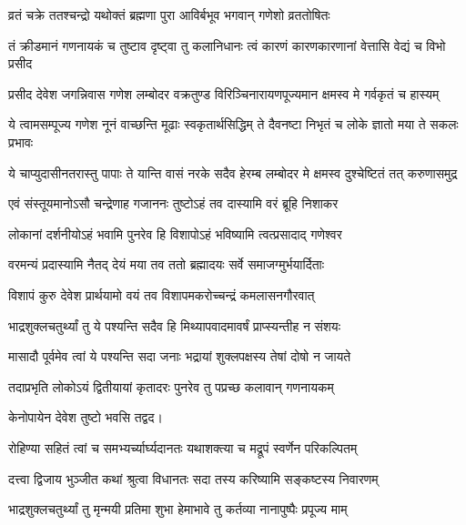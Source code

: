 \begin{center}
\twolineshloka
{व्रतं चक्रे ततश्चन्द्रो यथोक्तं ब्रह्मणा पुरा}
{आविर्बभूव भगवान् गणेशो व्रततोषितः}%

\fourlineindentedshloka
{तं क्रीडमानं गणनायकं च}
{तुष्टाव दृष्ट्वा तु कलानिधानः}
{त्वं कारणं कारणकारणानां}
{वेत्तासि वेद्यं च विभो प्रसीद}%

\fourlineindentedshloka
{प्रसीद देवेश जगन्निवास}
{गणेश लम्बोदर वक्रतुण्ड}
{विरिञ्चिनारायणपूज्यमान}
{क्षमस्व मे गर्वकृतं च हास्यम्}%

\fourlineindentedshloka
{ये त्वामसम्पूज्य गणेश नूनं}
{वाच्छन्ति मूढाः स्वकृतार्थसिद्धिम्}
{ते दैवनष्टा निभृतं च लोके}
{ज्ञातो मया ते सकलः प्रभावः}%

\fourlineindentedshloka
{ये चाप्युदासीनतरास्तु पापाः}
{ते यान्ति वासं नरके सदैव}
{हेरम्ब लम्बोदर मे क्षमस्व}
{दुश्चेष्टितं तत् करुणासमुद्र}%

\twolineshloka
{एवं संस्तूयमानोऽसौ चन्द्रेणाह गजाननः}
{तुष्टोऽहं तव दास्यामि वरं ब्रूहि निशाकर}%


\twolineshloka
{लोकानां दर्शनीयोऽहं भवामि पुनरेव हि}
{विशापोऽहं भविष्यामि त्वत्प्रसादाद् गणेश्वर}%


\twolineshloka
{वरमन्यं प्रदास्यामि नैतद् देयं मया तव}
{ततो ब्रह्मादयः सर्वे समाजग्मुर्भयार्दिताः}%

\twolineshloka
{विशापं कुरु देवेश प्रार्थयामो वयं तव}
{विशापमकरोच्चन्द्रं कमलासनगौरवात्}%

\twolineshloka
{भाद्रशुक्लचतुर्थ्यां तु ये पश्यन्ति सदैव हि}
{मिथ्यापवादमावर्षं प्राप्स्यन्तीह न संशयः}%

\twolineshloka
{मासादौ पूर्वमेव त्वां ये पश्यन्ति सदा जनाः}
{भद्रायां शुक्लपक्षस्य तेषां दोषो न जायते}%

\twolineshloka
{तदाप्रभृति लोकोऽयं द्वितीयायां कृतादरः}
{पुनरेव तु पप्रच्छ कलावान् गणनायकम्}%

{केनोपायेन देवेश तुष्टो भवसि तद्वद।}


\twolineshloka
{रोहिण्या सहितं त्वां च समभ्यर्च्यार्घ्यदानतः}
{यथाशक्त्या च मद्रूपं स्वर्णेन परिकल्पितम्}%

\twolineshloka
{दत्त्वा द्विजाय भुञ्जीत कथां श्रुत्वा विधानतः}
{सदा तस्य करिष्यामि सङ्कष्टस्य निवारणम्}%

\twolineshloka
{भाद्रशुक्लचतुर्थ्यां तु मृन्मयी प्रतिमा शुभा}
{हेमाभावे तु कर्तव्या नानापुष्पैः प्रपूज्य माम्}%


\end{center}
